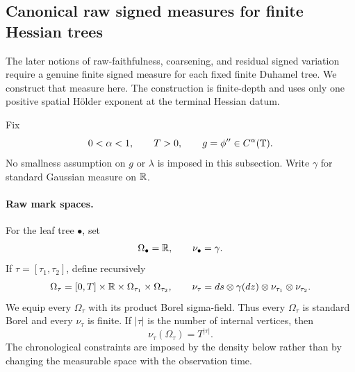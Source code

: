 \subsection{Canonical raw signed measures for finite Hessian trees}
\label{subsec:canonical-raw-measures}

The later notions of raw-faithfulness, coarsening, and residual signed variation require a genuine finite signed measure for each fixed finite Duhamel tree. We construct that measure here. The construction is finite-depth and uses only one positive spatial H\"older exponent at the terminal Hessian datum.

Fix
\begin{equation*}
  0<\alpha<1,
  \qquad
  T>0,
  \qquad
  g=\phi''\in C^\alpha(\mathbb T).
\end{equation*}
No smallness assumption on $g$ or $\lambda$ is imposed in this subsection. Write $\gamma$ for standard Gaussian measure on $\mathbb R$.

\paragraph{Raw mark spaces.}
For the leaf tree $\bullet$, set
\begin{equation*}
  \Omega_\bullet=\mathbb R,
  \qquad
  \nu_\bullet=\gamma.
\end{equation*}
If $\tau=[\tau_1,\tau_2]$, define recursively
\begin{equation}
  \Omega_\tau
  =
  [0,T]\times\mathbb R\times
  \Omega_{\tau_1}\times\Omega_{\tau_2},
  \qquad
  \nu_\tau
  =
  ds\otimes\gamma(dz)\otimes
  \nu_{\tau_1}\otimes\nu_{\tau_2}.
  \label{eq:raw-space-recursion}
\end{equation}
We equip every $\Omega_\tau$ with its product Borel sigma-field. Thus every $\Omega_\tau$ is standard Borel and every $\nu_\tau$ is finite. If $|\tau|$ is the number of internal vertices, then
\begin{equation*}
  \nu_\tau(\Omega_\tau)=T^{|\tau|}.
\end{equation*}
The chronological constraints are imposed by the density below rather than by changing the measurable space with the observation time.

